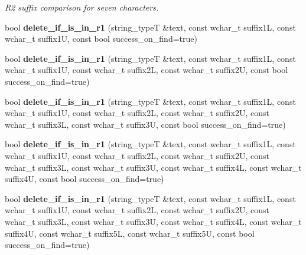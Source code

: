 \begin{DoxyCompactItemize}
\begin{DoxyCompactList}\small\item\em R2 suffix comparison for seven characters. \end{DoxyCompactList}\item 
\hypertarget{classstemming_1_1stem_a3bda630783eae1661f00fc5d2b51ce5c}{bool {\bfseries delete\+\_\+if\+\_\+is\+\_\+in\+\_\+r1} (string\+\_\+type\+T \&text, const wchar\+\_\+t suffix1\+L, const wchar\+\_\+t suffix1\+U, const bool success\+\_\+on\+\_\+find=true)}\label{classstemming_1_1stem_a3bda630783eae1661f00fc5d2b51ce5c}

\item 
\hypertarget{classstemming_1_1stem_a843e54b874cbb56a5d5997987137c933}{bool {\bfseries delete\+\_\+if\+\_\+is\+\_\+in\+\_\+r1} (string\+\_\+type\+T \&text, const wchar\+\_\+t suffix1\+L, const wchar\+\_\+t suffix1\+U, const wchar\+\_\+t suffix2\+L, const wchar\+\_\+t suffix2\+U, const bool success\+\_\+on\+\_\+find=true)}\label{classstemming_1_1stem_a843e54b874cbb56a5d5997987137c933}

\item 
\hypertarget{classstemming_1_1stem_af5c33c5c4644373cd85390c7e3282084}{bool {\bfseries delete\+\_\+if\+\_\+is\+\_\+in\+\_\+r1} (string\+\_\+type\+T \&text, const wchar\+\_\+t suffix1\+L, const wchar\+\_\+t suffix1\+U, const wchar\+\_\+t suffix2\+L, const wchar\+\_\+t suffix2\+U, const wchar\+\_\+t suffix3\+L, const wchar\+\_\+t suffix3\+U, const bool success\+\_\+on\+\_\+find=true)}\label{classstemming_1_1stem_af5c33c5c4644373cd85390c7e3282084}

\item 
\hypertarget{classstemming_1_1stem_a6be1595a7c29fec666ff808701be3eb2}{bool {\bfseries delete\+\_\+if\+\_\+is\+\_\+in\+\_\+r1} (string\+\_\+type\+T \&text, const wchar\+\_\+t suffix1\+L, const wchar\+\_\+t suffix1\+U, const wchar\+\_\+t suffix2\+L, const wchar\+\_\+t suffix2\+U, const wchar\+\_\+t suffix3\+L, const wchar\+\_\+t suffix3\+U, const wchar\+\_\+t suffix4\+L, const wchar\+\_\+t suffix4\+U, const bool success\+\_\+on\+\_\+find=true)}\label{classstemming_1_1stem_a6be1595a7c29fec666ff808701be3eb2}

\item 
\hypertarget{classstemming_1_1stem_abac9ef13a80efee3dad9b72476f7cd49}{bool {\bfseries delete\+\_\+if\+\_\+is\+\_\+in\+\_\+r1} (string\+\_\+type\+T \&text, const wchar\+\_\+t suffix1\+L, const wchar\+\_\+t suffix1\+U, const wchar\+\_\+t suffix2\+L, const wchar\+\_\+t suffix2\+U, const wchar\+\_\+t suffix3\+L, const wchar\+\_\+t suffix3\+U, const wchar\+\_\+t suffix4\+L, const wchar\+\_\+t suffix4\+U, const wchar\+\_\+t suffix5\+L, const wchar\+\_\+t suffix5\+U, const bool success\+\_\+on\+\_\+find=true)}\label{classstemming_1_1stem_abac9ef13a80efee3dad9b72476f7cd49}


\end{DoxyCompactItemize}
